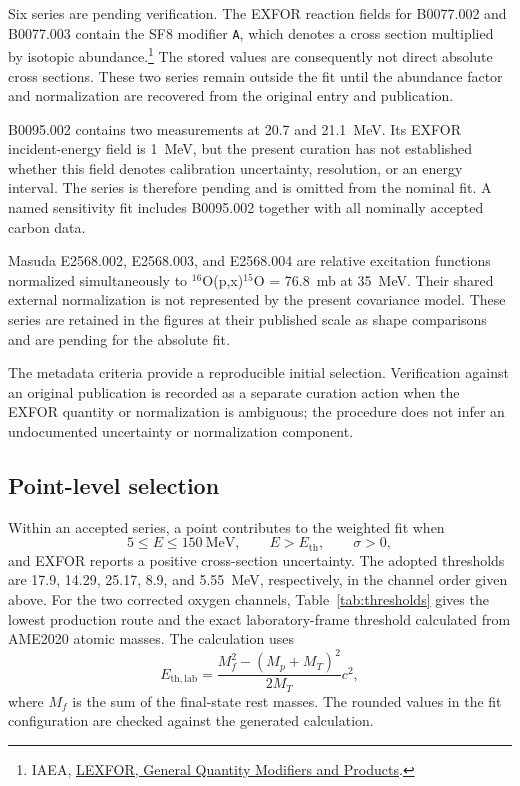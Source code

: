 \documentclass[11pt]{article}
\begin{document}
Six series are pending verification.  The EXFOR reaction fields for B0077.002
and B0077.003 contain the SF8 modifier \texttt{A}, which denotes a cross
section multiplied by isotopic abundance.\footnote{IAEA,
\href{https://nds.iaea.org/nrdc/nrdc_doc/iaea-nds-0208-200601.pdf}{LEXFOR,
General Quantity Modifiers and Products}.}  The stored values are consequently
not direct absolute cross sections.  These two series remain outside the fit
until the abundance factor and normalization are recovered from the original
entry and publication.

B0095.002 contains two measurements at 20.7 and \SI{21.1}{MeV}.  Its EXFOR
incident-energy field is \SI{1}{MeV}, but the present curation has not
established whether this field denotes calibration uncertainty, resolution,
or an energy interval.  The series is therefore pending and is omitted from
the nominal fit.  A named sensitivity fit includes B0095.002 together with all
nominally accepted carbon data.

Masuda E2568.002, E2568.003, and E2568.004 are relative excitation functions
normalized simultaneously to
$^{16}$O(p,x)$^{15}$O = \SI{76.8}{mb} at \SI{35}{MeV}.  Their shared external
normalization is not represented by the present covariance model.  These
series are retained in the figures at their published scale as shape
comparisons and are pending for the absolute fit.

The metadata criteria provide a reproducible initial selection.  Verification
against an original publication is recorded as a separate curation action when
the EXFOR quantity or normalization is ambiguous; the procedure does not infer
an undocumented uncertainty or normalization component.

\subsection{Point-level selection}

Within an accepted series, a point contributes to the weighted fit when
\begin{equation}
  5\leq E\leq150~\mathrm{MeV},\qquad
  E>E_{\mathrm{th}},\qquad
  \sigma>0,
\end{equation}
and EXFOR reports a positive cross-section uncertainty.  The adopted thresholds
are 17.9, 14.29, 25.17, 8.9, and \SI{5.55}{MeV}, respectively, in the channel
order given above.  For the two corrected oxygen channels, Table~\ref{tab:thresholds}
gives the lowest production route and the exact laboratory-frame threshold
calculated from AME2020 atomic masses.  The calculation uses
\begin{equation}
 E_{\mathrm{th,lab}}=
 \frac{M_f^2-(M_p+M_T)^2}{2M_T}c^2,
\end{equation}
where $M_f$ is the sum of the final-state rest masses.  The rounded values in
the fit configuration are checked against the generated calculation.
\end{document}
